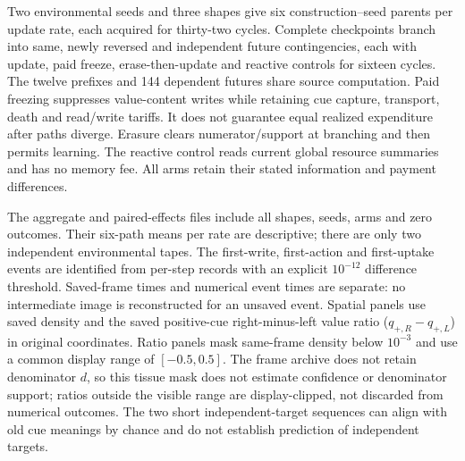 Two environmental seeds and three shapes give six construction--seed parents per update rate, each acquired for thirty-two cycles. Complete checkpoints branch into same, newly reversed and independent future contingencies, each with update, paid freeze, erase-then-update and reactive controls for sixteen cycles. The twelve prefixes and 144 dependent futures share source computation. Paid freezing suppresses value-content writes while retaining cue capture, transport, death and read/write tariffs. It does not guarantee equal realized expenditure after paths diverge. Erasure clears numerator/support at branching and then permits learning. The reactive control reads current global resource summaries and has no memory fee. All arms retain their stated information and payment differences.

The aggregate and paired-effects files include all shapes, seeds, arms and zero outcomes. Their six-path means per rate are descriptive; there are only two independent environmental tapes. The first-write, first-action and first-uptake events are identified from per-step records with an explicit $10^{-12}$ difference threshold. Saved-frame times and numerical event times are separate: no intermediate image is reconstructed for an unsaved event. Spatial panels use saved density and the saved positive-cue right-minus-left value ratio ($q_{+,R}-q_{+,L}$) in original coordinates. Ratio panels mask same-frame density below $10^{-3}$ and use a common display range of $[-0.5,0.5]$. The frame archive does not retain denominator $d$, so this tissue mask does not estimate confidence or denominator support; ratios outside the visible range are display-clipped, not discarded from numerical outcomes. The two short independent-target sequences can align with old cue meanings by chance and do not establish prediction of independent targets.

